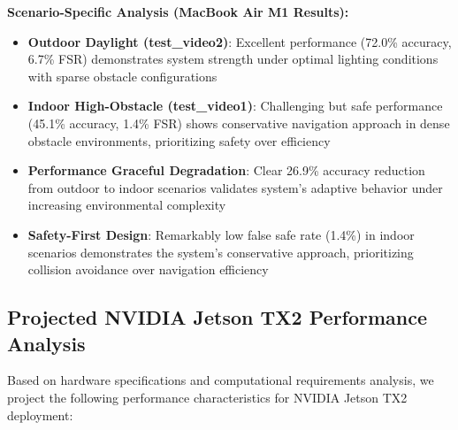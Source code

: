 \documentclass[10pt]{article}
\begin{document}
\begin{table}[ht]
\centering
\caption{Performance Analysis Across Navigation Scenarios}
\label{tab:scenario_performance}
\end{table}

\textbf{Scenario-Specific Analysis (MacBook Air M1 Results):}
\begin{itemize}
\item \textbf{Outdoor Daylight (test\_video2)}: Excellent performance (72.0\% accuracy, 6.7\% FSR) demonstrates system strength under optimal lighting conditions with sparse obstacle configurations
\item \textbf{Indoor High-Obstacle (test\_video1)}: Challenging but safe performance (45.1\% accuracy, 1.4\% FSR) shows conservative navigation approach in dense obstacle environments, prioritizing safety over efficiency
\item \textbf{Performance Graceful Degradation}: Clear 26.9\% accuracy reduction from outdoor to indoor scenarios validates system's adaptive behavior under increasing environmental complexity
\item \textbf{Safety-First Design}: Remarkably low false safe rate (1.4\%) in indoor scenarios demonstrates the system's conservative approach, prioritizing collision avoidance over navigation efficiency
\end{itemize}

\subsection{Projected NVIDIA Jetson TX2 Performance Analysis}

Based on hardware specifications and computational requirements analysis, we project the following performance characteristics for NVIDIA Jetson TX2 deployment:
\end{document}
